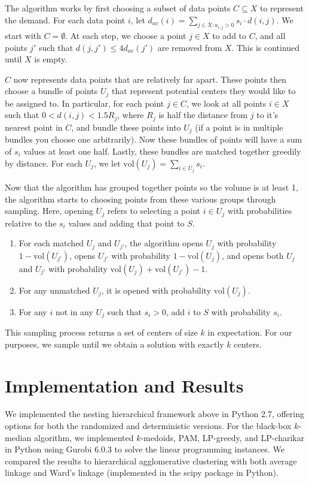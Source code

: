 \documentclass[conference, 10pt, final]{IEEEtran}
\begin{document}
The algorithm works by first choosing a subset of data points $C \subseteq X$ to represent the demand. For each data point $i$, let $d_{av}(i) = \sum_{j \in X : a_{i,j} > 0} s_i \cdot d(i,j)$. We start with $C = \emptyset$. At each step, we choose a point $j \in X$ to add to $C$, and all points $j'$ such that $d(j,j') \leq 4 d_{av}(j') $ are removed from $X$. This is continued until $X$ is empty. 

$C$ now represents data points that are relatively far apart. These points then choose a bundle of points $U_j$ that represent potential centers they would like to be assigned to. In particular, for each point $j \in C$, we look at all points $i \in X$ such that $0 < d(i,j) < 1.5 R_j$, where $R_j$ is half the distance from $j$ to it's nearest point in $C$, and bundle these points into $U_j$ (if a point is in multiple bundles you choose one arbitrarily). Now these bundles of points will have a sum of $s_i$ values at least one half. Lastly, these bundles are matched together greedily by distance. For each $U_j$, we let $\mathrm{vol}(U_j) = \sum_{i \in U_j} s_i$. 

Now that the algorithm has grouped together points so the volume is at least 1, the algorithm starts to choosing points from these various groups through sampling. Here, opening $U_j$ refers to selecting a point $i \in U_j$ with probabilities relative to the $s_i$ values and adding that point to $S$. 
\begin{enumerate}[\IEEEsetlabelwidth{3)}]
\item For each matched $U_j$ and $U_{j'}$, the algorithm opens $U_j$ with probability $1-\mathrm{vol}(U_{j'})$, opens $U_{j'}$ with probability $1- \mathrm{vol}(U_j)$, and opens both $U_{j}$ and $U_{j'}$ with probability $\mathrm{vol}(U_j) + \mathrm{vol}(U_{j'}) -1$. 
\item For any unmatched $U_j$, it is opened with probability $\mathrm{vol}(U_j)$.
\item For any $i$ not in any $U_j$ such that $s_i > 0$, add $i$ to $S$ with probability $s_i$. 
\end{enumerate}
This sampling process returns a set of centers of size $k$  in expectation. For our purposes, we sample until we obtain a solution with exactly $k$ centers. 

\section{Implementation and Results}
We implemented the nesting hierarchical framework above in Python 2.7, offering options for both the randomized and deterministic versions. For the black-box $k$-median algorithm, we implemented $k$-medoids, PAM, LP-greedy, and LP-charikar in Python using Gurobi 6.0.3 to solve the linear programming instances. We compared the results to hierarchical agglomerative clustering with both average linkage and Ward's linkage (implemented in the scipy package in Python). 
\end{document}
